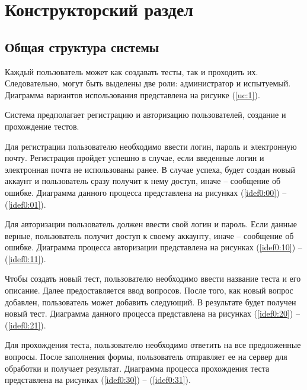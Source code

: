 \chapter{Конструкторский раздел}

\section{Общая структура системы}
Каждый пользователь может как создавать тесты, так и проходить их. Следовательно, могут быть выделены две роли: администратор и испытуемый. Диаграмма вариантов использования представлена на рисунке (\ref{uc:1}).

Система предполагает регистрацию и авторизацию пользователей, создание и прохождение тестов. 
	
Для регистрации пользователю необходимо ввести логин, пароль и электронную почту. Регистрация пройдет успешно в случае, если введенные логин и электронная почта не использованы ранее. В случае успеха, будет создан новый аккаунт и пользователь сразу получит к нему доступ, иначе -- сообщение об ошибке. Диаграмма данного процесса представлена на рисунках (\ref{idef0:00}) -- (\ref{idef0:01}).

Для авторизации пользователь должен ввести свой логин и пароль. Если данные верные, пользователь получит доступ к своему аккаунту, иначе -- сообщение об ошибке. Диаграмма процесса авторизации представлена на рисунках (\ref{idef0:10}) -- (\ref{idef0:11}).

Чтобы создать новый тест, пользователю необходимо ввести название теста и его описание. Далее предоставляется ввод вопросов. После того, как новый вопрос добавлен, пользователь может добавить следующий. В результате будет получен новый тест. Диаграмма данного процесса представлена на рисунках  (\ref{idef0:20}) -- (\ref{idef0:21}).

Для прохождения теста, пользователю необходимо ответить на все предложенные вопросы. После заполнения формы, пользователь отправляет ее на сервер для обработки и получает результат. Диаграмма процесса прохождения теста представлена на рисунках  (\ref{idef0:30}) -- (\ref{idef0:31}).


\begin{figure}[ht!]
\end{figure}

